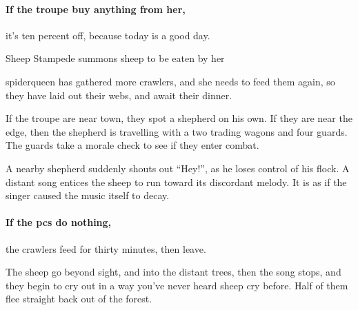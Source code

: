 \paragraph{If the troupe buy anything from her,}
it's ten percent off, because today is a good day.


{Sheep Stampede}%
{ summons sheep to be eaten by her }%

\begin{exampletext}
  \Gls{spiderqueen} has gathered more \glspl{crawler}, and she needs to feed them again, so they have laid out their webs, and await their dinner.
\end{exampletext}

If the troupe are near town, they spot a shepherd on his own.
If they are near the \gls{edge}, then the shepherd is travelling with a two trading wagons and four \glspl{guard}. 
The \glspl{guard} take a morale check to see if they enter combat.%


\begin{boxtext}
  A nearby shepherd suddenly shouts out ``Hey!'', as he loses control of his flock.
  A distant song entices the sheep to run toward its discordant melody. It is as if the singer caused the music itself to decay.
\end{boxtext}

\paragraph{If the \glspl{pc} do nothing,}
the \glspl{crawler} feed for thirty minutes, then leave.

\begin{boxtext}
  The sheep go beyond sight, and into the distant trees, then the song stops, and they begin to cry out in a way you've never heard sheep cry before.  Half of them flee straight back out of the forest.
\end{boxtext}

